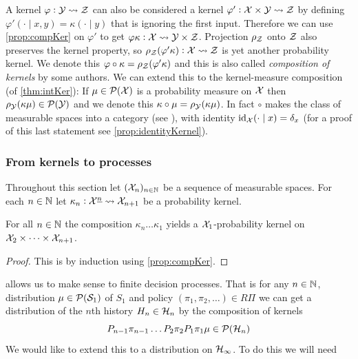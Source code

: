 \begin{rem}
  A kernel $\varphi:\mathcal{Y} \leadsto \mathcal{Z}$
  can also be considered a kernel
  $\varphi' : \mathcal{X} \times \mathcal{Y} \leadsto \mathcal{Z}$
  by defining
  $\varphi'(\cdot \mid x, y) = \kappa(\cdot \mid y)$
  that is ignoring the first input.
  Therefore we can use \cref{prop:compKer} on $\varphi'$ to get
  $\varphi \kappa : \mathcal{X} \leadsto \mathcal{Y} \times \mathcal{Z}$.
  Projection $\rho_\mathcal{Z}$ onto $\mathcal{Z}$ also preserves the kernel property,
  so $\rho_\mathcal{Z}(\varphi' \kappa) : \mathcal{X} \leadsto \mathcal{Z}$ is
  yet another probability kernel.
  We denote this $\varphi \circ \kappa = \rho_\mathcal{Z}(\varphi' \kappa)$
  and this is also called \emph{composition of kernels} by some authors.
  We can extend this to the kernel-measure composition (of \cref{thm:intKer}):
  If $\mu \in \mathcal{P}(\mathcal{X})$ is a probability measure on $\mathcal{X}$ then
  $\rho_\mathcal{Y}(\kappa \mu) \in \mathcal{P}(\mathcal{Y})$ and we denote this
  $\kappa \circ \mu = \rho_\mathcal{Y}(\kappa \mu)$.
  In fact $\circ$ makes the class of measurable spaces
  into a category (see ),
  with identity $\text{id}_{\mathcal{X}}(\cdot \mid x) = \delta_x$
  (for a proof of this last statement see \cref{prop:identityKernel}).
  \label{rem:altComp}
\end{rem}

\subsubsection{From kernels to processes}

Throughout this section let $(\mathcal{X}_n)_{n \in \mathbb{N}}$ be a sequence
of measurable spaces. For each $n \in \mathbb{N}$ let
$\kappa_n : \mathcal{X}^{\underline{n}} \leadsto \mathcal{X}_{n+1}$ be a probability kernel.

\begin{prop} For all $n \in \mathbb{N}$ the composition
  $\kappa_n \dots \kappa_1$ yields a $\mathcal{X}_1$-probability
  kernel on $\mathcal{X}_2 \times \dots \times \mathcal{X}_{n+1}$.
  \label{prop:kappaN}
\end{prop}
\begin{proof}
  This is by induction using \cref{prop:compKer}.
\end{proof}

 allows us to make sense to finite decision processes.
That is for any
$n \in \mathbb{N}$, distribution $\mu \in \mathcal{P}(\mathcal{S}_1)$ of $S_1$ 
and policy $(\pi_1, \pi_2, \dots) \in R\Pi$ we can get a distribution
of the $n$th history $H_n \in \mathcal{H}_n$ by the composition of kernels
\[ P_{n-1} \pi_{n-1} 
\dots P_2 \pi_2 P_1 \pi_1 \mu \in \mathcal{P}(\mathcal{H}_n) \]
We would like to extend this to a distribution on $\mathcal{H}_\infty$.
To do this we will need

